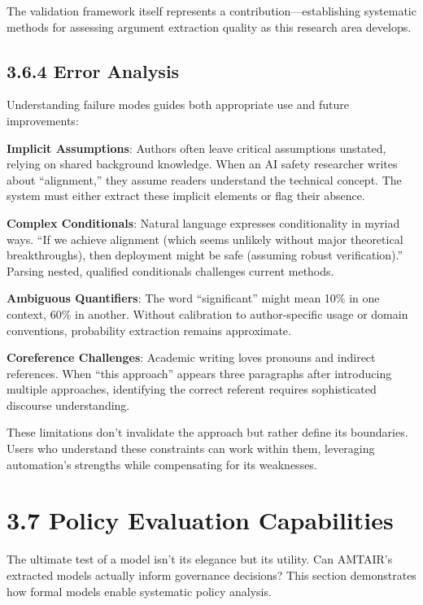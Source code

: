 \documentclass[
  11pt,
  letterpaper,
  openany]{book}
\begin{document}
The validation framework itself represents a contribution---establishing
systematic methods for assessing argument extraction quality as this
research area develops.

\subsection{3.6.4 Error Analysis}\label{sec-error-analysis}

Understanding failure modes guides both appropriate use and future
improvements:

\textbf{Implicit Assumptions}: Authors often leave critical assumptions
unstated, relying on shared background knowledge. When an AI safety
researcher writes about ``alignment,'' they assume readers understand
the technical concept. The system must either extract these implicit
elements or flag their absence.

\textbf{Complex Conditionals}: Natural language expresses conditionality
in myriad ways. ``If we achieve alignment (which seems unlikely without
major theoretical breakthroughs), then deployment might be safe
(assuming robust verification).'' Parsing nested, qualified conditionals
challenges current methods.

\textbf{Ambiguous Quantifiers}: The word ``significant'' might mean 10\%
in one context, 60\% in another. Without calibration to author-specific
usage or domain conventions, probability extraction remains approximate.

\textbf{Coreference Challenges}: Academic writing loves pronouns and
indirect references. When ``this approach'' appears three paragraphs
after introducing multiple approaches, identifying the correct referent
requires sophisticated discourse understanding.

These limitations don't invalidate the approach but rather define its
boundaries. Users who understand these constraints can work within them,
leveraging automation's strengths while compensating for its weaknesses.

\section{3.7 Policy Evaluation
Capabilities}\label{sec-policy-evaluation}

The ultimate test of a model isn't its elegance but its utility. Can
AMTAIR's extracted models actually inform governance decisions? This
section demonstrates how formal models enable systematic policy
analysis.
\end{document}
